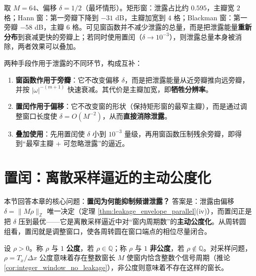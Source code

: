 \begin{example}[同样偏移下窗函数的对比]\label{ex:window_comparison_numeric}
取 $M=64$、偏移 $\delta=1/2$（最坏情形）。矩形窗：泄露占比约 $0.595$，主瓣宽 $2$ 格；Hann 窗：第一旁瓣下降到 $-31$ dB，主瓣加宽到 $4$ 格；Blackman 窗：第一旁瓣 $-58$ dB，主瓣 $6$ 格。可见窗函数并不减少泄露的总量，而是把泄露能量\textbf{重新分布}到衰减更快的旁瓣上；若同时使用置闰（$\delta\to10^{-3}$），则泄露总量本身被消除，两者效果可以叠加。
\end{example}

\begin{remark}[窗函数与置闰的互补性]\label{rem:window_and_intercalation_complementarity}
两种手段作用于泄露的不同环节，构成互补：
\begin{enumerate}[label=(\roman*)]
    \item \textbf{窗函数作用于旁瓣}：它不改变偏移 $\delta$，而是把泄露能量从近旁瓣推向远旁瓣，并按 $|\omega|^{-(m+1)}$ 快速衰减。其代价是主瓣加宽，即\textbf{牺牲分辨率}。
    \item \textbf{置闰作用于偏移}：它不改变窗的形状（保持矩形窗的最窄主瓣），而是通过调整窗口长度使 $\delta=O(M^{-2})$，从而\textbf{直接消除泄露}。
    \item \textbf{叠加使用}：先用置闰使 $\delta$ 小到 $10^{-3}$ 量级，再用窗函数压制残余旁瓣，即得到“最窄主瓣 + 可忽略泄露”的逼近。
\end{enumerate}
\end{remark}

\section{置闰：离散采样逼近的主动公度化}\label{sec:commensurability_intercalation}

本节回答本章的核心问题：\textbf{置闰为何能抑制频谱泄露？} 答案是：泄露由偏移 $\delta=\|M\rho\|_{\mathbb{Z}}$ 唯一决定（定理 \ref{thm:leakage_envelope_parallel}(iv)），而置闰正是把 $\delta$ 压到最优——它是离散采样逼近中对“窗内周期数”的\textbf{主动公度化}。从周转圆组看，置闰就是调整窗口，使各周转圆在窗口端点的相位尽量闭合。

\begin{definition}[公度性]\label{def:commensurability_parallel}
设 $\rho>0$。称 $\rho$ 与 $1$ \textbf{公度}，若 $\rho\in\mathbb{Q}$；称 $\rho$ 与 $1$ \textbf{非公度}，若 $\rho\notin\mathbb{Q}$。对采样问题，$\rho=T_x/\Delta x$ 公度意味着存在整数窗长 $M$ 使窗内恰含整数个信号周期（推论 \ref{cor:integer_window_no_leakage}），非公度则意味着不存在这样的窗长。
\end{definition}

